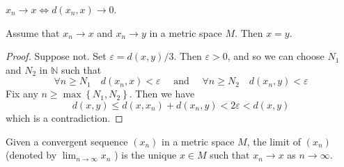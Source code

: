 \documentclass[a4paper,11pt]{article}
\begin{document}
\begin{note}
    $x_{n} \rightarrow x \Longleftrightarrow d\left(x_{n}, x\right) \rightarrow 0$.
\end{note}
\begin{lemma}\label{lma:1}
    Assume that $x_{n} \rightarrow x$ and $x_{n} \rightarrow y$ in a metric space $M$. Then $x=y$.
\end{lemma}

\begin{proof}
    Suppose not. Set $\varepsilon=d(x, y) / 3 .$ Then $\varepsilon>0$, and so we can choose $N_{1}$ and $N_{2}$ in $\mathbb{N}$ such that
    \[
    \forall n \geqslant N_{1} \quad d\left(x_{n}, x\right)<\varepsilon \quad \text { and } \quad \forall n \geqslant N_{2} \quad d\left(x_{n}, y\right)<\varepsilon
    \]
    Fix any $n \geqslant \max \left\{N_{1}, N_{2}\right\} .$ Then we have
    \[
    d(x, y) \leqslant d\left(x, x_{n}\right)+d\left(x_{n}, y\right)<2 \varepsilon<d(x, y)
    \]
    which is a contradiction.
\end{proof}

\begin{definition}
    Given a convergent sequence $\left(x_{n}\right)$ in a metric space $M$, the limit of $\left(x_{n}\right)$ (denoted by $\lim _{n \rightarrow \infty} x_{n}$ ) is the unique $x \in M$ such that $x_{n} \rightarrow x$ as $n \rightarrow \infty$.
\end{definition}
\end{document}
